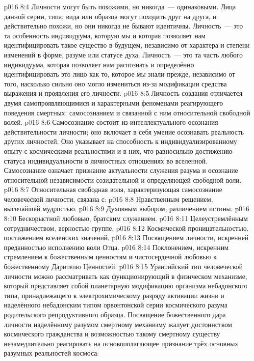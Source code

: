 \vs p016 8:4 Личности могут быть похожими, но никогда~--- одинаковыми. Лица данной серии, типа, вида или образца могут походить друг на друга, и действительно похожи, но они никогда не бывают идентичны. Личность~--- это та особенность индивидуума, которую мы  и которая позволяет нам идентифицировать такое существо в будущем, независимо от характера и степени изменений в форме, разуме или статусе духа. Личность~--- это та часть любого индивидуума, которая позволяет нам распознать и определённо идентифицировать это лицо как то, которое мы знали прежде, независимо от того, насколько сильно оно могло измениться из-за модификации средства выражения и проявления его личности.
\vs p016 8:5 \pc Личность создания отличается двумя самопроявляющимися и характерными феноменами реагирующего поведения смертных: самосознанием и связанной с ним относительной свободной волей.
\vs p016 8:6 Самосознание состоит из интеллектуального осознания действительности личности; оно включает в себя умение осознавать реальность других личностей. Оно указывает на способность к индивидуализированному опыту с космическими реальностями и в них, что равносильно достижению статуса индивидуальности в личностных отношениях во вселенной. Самосознание означает признание актуальности служения разума и осознание относительной независимости созидательной и определяющей свободной воли.
\vs p016 8:7 \pc Относительная свободная воля, характеризующая самосознание человеческой личности, связана с:
\vs p016 8:8 Нравственным решением, высочайшей мудростью.
\vs p016 8:9 Духовным выбором, различением истины.
\vs p016 8:10 Бескорыстной любовью, братским служением.
\vs p016 8:11 Целеустремлённым сотрудничеством, верностью группе.
\vs p016 8:12 Космической проницательностью, постижением вселенских значений.
\vs p016 8:13 Посвящением личности, искренней преданностью исполнению воли Отца.
\vs p016 8:14 Поклонением, искренним стремлением к божественным ценностям и чистосердечной любовью к божественному Дарителю Ценностей.
\vs p016 8:15 \pc Урантийский тип человеческой личности можно рассматривать как функционирующий в физическом механизме, который представляет собой планетарную модификацию организма небадонского типа, принадлежащего к электрохимическому разряду активации жизни и наделённого небадонским типом орвонтонской серии космического разума родительского репродуктивного образца. Посвящение божественного дара личности наделённому разумом смертному механизму жалует достоинством космического гражданства и возможностью такому смертному существу незамедлительно реагировать на основополагающее признание трёх основных разумных реальностей космоса:
